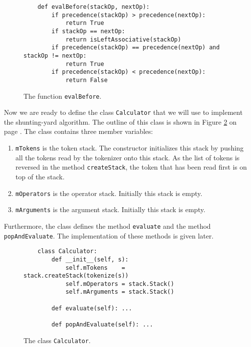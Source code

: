 \begin{figure}[!ht]
\centering
\begin{verbatim}
    def evalBefore(stackOp, nextOp):
        if precedence(stackOp) > precedence(nextOp):
            return True
        if stackOp == nextOp:
            return isLeftAssociative(stackOp)
        if precedence(stackOp) == precedence(nextOp) and stackOp != nextOp:
            return True
        if precedence(stackOp) < precedence(nextOp):
            return False
\end{verbatim}
\vspace*{-0.3cm}
\caption{The function \texttt{evalBefore}.}
\label{fig:evalBefore}
\end{figure}

Now we are ready to define the class \texttt{Calculator} that we will use to implement the shunting-yard
algorithm.  The outline of this class is shown in Figure \ref{fig:Calculator.ipynb} on page
\pageref{fig:Calculator.ipynb}.  The class contains three member variables:
\begin{enumerate}
\item \texttt{mTokens} is the token stack.  The constructor initializes this stack by pushing all the tokens
      read by the tokenizer onto this stack.  As the list of tokens is reversed in the method
      \texttt{createStack}, the token that has been read first is on top of the stack.
\item \texttt{mOperators} is the operator stack.  Initially this stack is empty.
\item \texttt{mArguments} is the argument stack.  Initially this stack is empty.
\end{enumerate}
Furthermore, the class defines the method \texttt{evaluate} and the method \texttt{popAndEvaluate}.
The implementation of these methods is given later.

\begin{figure}[!ht]
  \centering
\begin{verbatim}
    class Calculator:
        def __init__(self, s):
            self.mTokens    = stack.createStack(tokenize(s))
            self.mOperators = stack.Stack()
            self.mArguments = stack.Stack()
    
        def evaluate(self): ...

        def popAndEvaluate(self): ...
\end{verbatim}
\vspace*{-0.3cm}
  \caption{The class \texttt{Calculator}.}
  \label{fig:Calculator.ipynb}
\end{figure} 

